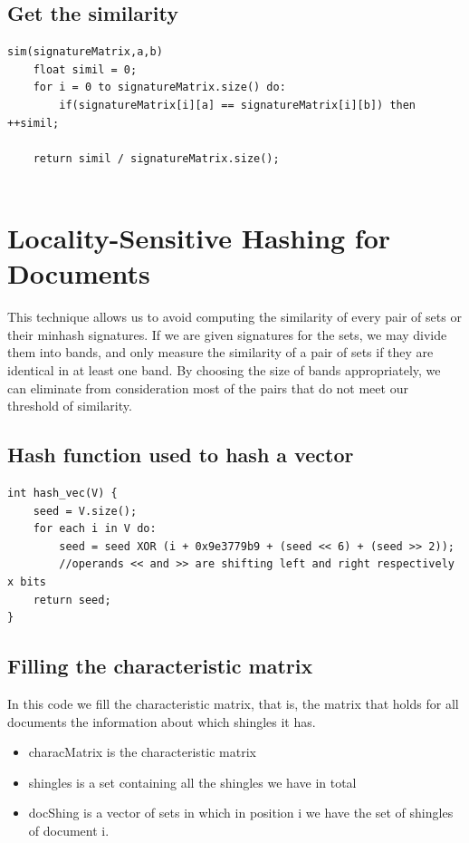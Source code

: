 \documentclass[12pt]{article}
\begin{document}
\subsection{Get the similarity}
\begin{lstlisting}
sim(signatureMatrix,a,b)
    float simil = 0;
    for i = 0 to signatureMatrix.size() do:
        if(signatureMatrix[i][a] == signatureMatrix[i][b]) then ++simil;
 
    return simil / signatureMatrix.size();


\end{lstlisting}

\section{Locality-Sensitive Hashing for Documents}
 This technique allows us to avoid computing the similarity of every pair of sets or their minhash signatures. If we are given signatures for the sets, we may divide them into bands, and only measure the similarity of a pair of sets if they are identical in at least one band. By choosing the size of bands appropriately, we can eliminate from consideration most of the pairs that do not meet our threshold of similarity.
 \medskip 
 
\subsection{Hash function used to hash a vector}
 \begin{lstlisting}
int hash_vec(V) {
	seed = V.size();
	for each i in V do:
		seed = seed XOR (i + 0x9e3779b9 + (seed << 6) + (seed >> 2));
		//operands << and >> are shifting left and right respectively x bits
	return seed;
}

\end{lstlisting}
 \medskip 

\subsection{Filling the characteristic matrix}
In this code we fill the characteristic matrix, that is, the matrix that holds for all documents the information about which shingles it has.
\begin{itemize}
\item characMatrix is the characteristic matrix
\item shingles is a set containing all the shingles we have in total
\item docShing is a vector of sets in which in position i we have the set of shingles of document i. 
\end{itemize}
\end{document}
